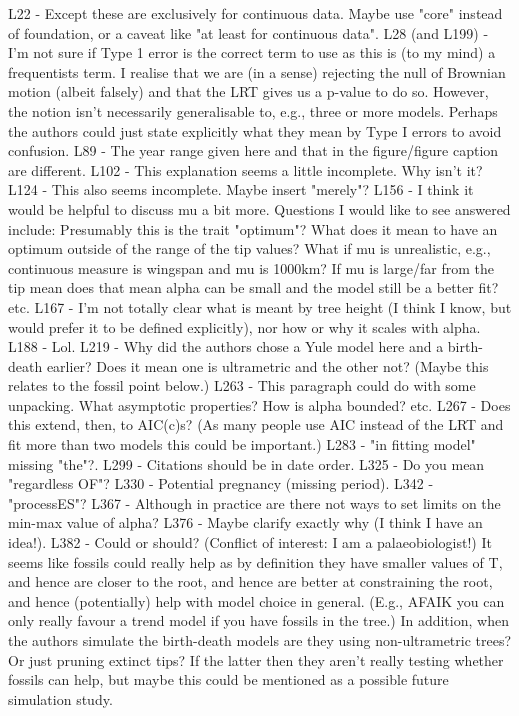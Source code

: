 \documentclass[11pt]{letter}
\begin{document}
\begin{letter}{}
L22 - Except these are exclusively for continuous data. Maybe use "core" instead of foundation, or a caveat like "at least for continuous data".
L28 (and L199) - I'm not sure if Type 1 error is the correct term to use as this is (to my mind) a frequentists term. I realise that we are (in a sense) rejecting the null of Brownian motion (albeit falsely) and that the LRT gives us a p-value to do so. However, the notion isn't necessarily generalisable to, e.g., three or more models. Perhaps the authors could just state explicitly what they mean by Type I errors to avoid confusion.
L89 - The year range given here and that in the figure/figure caption are different.
L102 - This explanation seems a little incomplete. Why isn't it?
L124 - This also seems incomplete. Maybe insert "merely"?
L156 - I think it would be helpful to discuss mu a bit more. Questions I would like to see answered include: Presumably this is the trait "optimum"? What does it mean to have an optimum outside of the range of the tip values? What if mu is unrealistic, e.g., continuous measure is wingspan and mu is 1000km? If mu is large/far from the tip mean does that mean alpha can be small and the model still be a better fit? etc.
L167 - I'm not totally clear what is meant by tree height (I think I know, but would prefer it to be defined explicitly), nor how or why it scales with alpha.
L188 - Lol.
L219 - Why did the authors chose a Yule model here and a birth-death earlier? Does it mean one is ultrametric and the other not? (Maybe this relates to the fossil point below.)
L263 - This paragraph could do with some unpacking. What asymptotic properties? How is alpha bounded? etc.
L267 - Does this extend, then, to AIC(c)s? (As many people use AIC instead of the LRT and fit more than two models this could be important.)
L283 - "in fitting model" missing "the"?.
L299 - Citations should be in date order.
L325 - Do you mean "regardless OF"?
L330 - Potential pregnancy (missing period).
L342 - "processES"?
L367 - Although in practice are there not ways to set limits on the min-max value of alpha?
L376 - Maybe clarify exactly why (I think I have an idea!).
L382 - Could or should? (Conflict of interest: I am a palaeobiologist!) It seems like fossils could really help as by definition they have smaller values of T, and hence are closer to the root, and hence are better at constraining the root, and hence (potentially) help with model choice in general. (E.g., AFAIK you can only really favour a trend model if you have fossils in the tree.) In addition, when the authors simulate the birth-death models are they using non-ultrametric trees? Or just pruning extinct tips? If the latter then they aren't really testing whether fossils can help, but maybe this could be mentioned as a possible future simulation study.

\end{letter}
\end{document}
